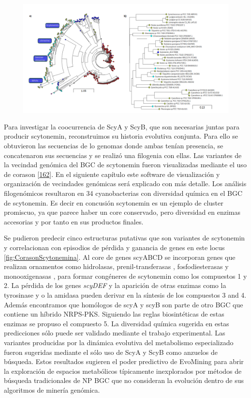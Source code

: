 \documentclass[12pt,twoside]{reedthesis}
\begin{document}
  \begin{figure}[h!tbp]
  \centering
  \includegraphics[angle = 0,scale = .48]{EvoMining/supplementary/AroB.png}
  \caption[AroB en Cyanobacteria]{\footnotesize{}}
  \label{fig:AroB}
  \end{figure}
  
  Para investigar la coocurrencia de ScyA y ScyB, que son necesarias
  juntas para producir scytonemin, reconstruimos su historia evolutiva
  conjunta. Para ello se obtuvieron las secuencias de lo genomas donde
  ambas tenían presencia, se concatenaron sus secuencias y se realizó una
  filogenia con ellas. Las variantes de la vecindad genómica del BGC de
  scytonemin fueron visualizadas mediante el uso de corason
  {[}\protect\hyperlink{ref-navarro-munoz_computational_2018}{162}{]}. En
  el siguiente capítulo este software de visualización y organización de
  vecindades genómicas será explicado con más detalle. Los análisis
  filogenómicos resultaron en 34 cyanobacterias con diversidad química en
  el BGC de scytonemin. Es decir en concusión scytonemin es un ejemplo de
  cluster promiscuo, ya que parece haber un core conservado, pero
  diversidad en enzimas accesorias y por tanto en sus productos finales.
  
  Se pudieron predecir cinco estructuras putativas que son variantes de
  scytonemin y correlacionan con episodios de pérdida y ganancia de genes
  en este locus \autoref{fig:CorasonScytonemina}. Al core de genes scyABCD
  se incorporan genes que realizan ornamentos como hidrolasas,
  prenil-transferasas , fosfodiesterasas y monooxigenasas , para formar
  congéneres de scytonemin como los compuestos 1 y 2. La pérdida de los
  genes \emph{scyDEF} y la aparición de otras enzimas como la tyrosinase y
  o la amidasa pueden derivar en la síntesis de los compuestos 3 and 4.
  Además encontramos que homólogos de scyA y scyB son parte de otro BGC
  que contiene un híbrido NRPS-PKS. Siguiendo las reglas biosintéticas de
  estas enzimas se propuso el compuesto 5. La diversidad química sugerida
  en estas predicciones sólo puede ser validado mediante el trabajo
  experimental. Las variantes producidas por la dinámica evolutiva del
  metabolismo especializado fueron sugeridas mediante el sólo uso de ScyA
  y ScyB como anzuelos de búsqueda. Estos resultados sugieren el poder
  predictivo de EvoMining para abrir la exploración de espacios
  metabólicos típicamente inexplorados por métodos de búsqueda
  tradicionales de NP BGC que no consideran la evolución dentro de sus
  algoritmos de minería genómica.
  
\end{document}
